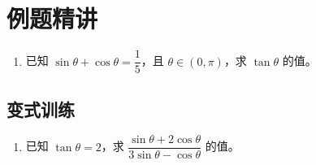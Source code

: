 \documentclass[11pt,a4paper]{article}
\begin{document}
\section*{例题精讲}

\begin{enumerate}[label=\textbf{例\arabic*.}]

\item 已知 \(\sin\theta + \cos\theta = \dfrac{1}{5}\)，且 \(\theta \in (0, \pi)\)，求 \(\tan\theta\) 的值。

\vspace{2em}

\end{enumerate}

\subsection*{变式训练}

\begin{enumerate}[label=\textbf{例\arabic*.}, resume]

\item 已知 \(\tan\theta = 2\)，求 \(\dfrac{\sin\theta + 2\cos\theta}{3\sin\theta - \cos\theta}\) 的值。

\vspace{2em}

\end{enumerate}
\end{document}
